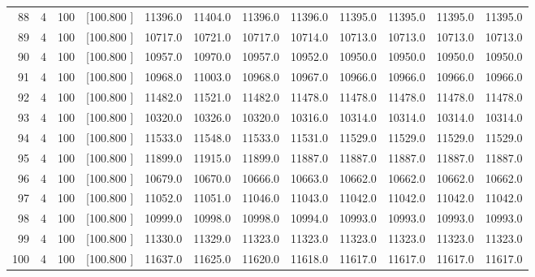 \documentclass[12pt,a4paper]{article}
\begin{document}
\begin{center}
{\begin{tabular}{r r r r r r r r r r r r}
  88&  4&100&[100.800   ]& 11396.0& 11404.0& 11396.0& 11396.0& 11395.0& 11395.0& 11395.0& 11395.0\\[-0.02in]
  89&  4&100&[100.800   ]& 10717.0& 10721.0& 10717.0& 10714.0& 10713.0& 10713.0& 10713.0& 10713.0\\[-0.02in]
  90&  4&100&[100.800   ]& 10957.0& 10970.0& 10957.0& 10952.0& 10950.0& 10950.0& 10950.0& 10950.0\\[-0.02in]
  91&  4&100&[100.800   ]& 10968.0& 11003.0& 10968.0& 10967.0& 10966.0& 10966.0& 10966.0& 10966.0\\[-0.02in]
  92&  4&100&[100.800   ]& 11482.0& 11521.0& 11482.0& 11478.0& 11478.0& 11478.0& 11478.0& 11478.0\\[-0.02in]
  93&  4&100&[100.800   ]& 10320.0& 10326.0& 10320.0& 10316.0& 10314.0& 10314.0& 10314.0& 10314.0\\[-0.02in]
  94&  4&100&[100.800   ]& 11533.0& 11548.0& 11533.0& 11531.0& 11529.0& 11529.0& 11529.0& 11529.0\\[-0.02in]
  95&  4&100&[100.800   ]& 11899.0& 11915.0& 11899.0& 11887.0& 11887.0& 11887.0& 11887.0& 11887.0\\[-0.02in]
  96&  4&100&[100.800   ]& 10679.0& 10670.0& 10666.0& 10663.0& 10662.0& 10662.0& 10662.0& 10662.0\\[-0.02in]
  97&  4&100&[100.800   ]& 11052.0& 11051.0& 11046.0& 11043.0& 11042.0& 11042.0& 11042.0& 11042.0\\[-0.02in]
  98&  4&100&[100.800   ]& 10999.0& 10998.0& 10998.0& 10994.0& 10993.0& 10993.0& 10993.0& 10993.0\\[-0.02in]
  99&  4&100&[100.800   ]& 11330.0& 11329.0& 11323.0& 11323.0& 11323.0& 11323.0& 11323.0& 11323.0\\[-0.02in]
 100&  4&100&[100.800   ]& 11637.0& 11625.0& 11620.0& 11618.0& 11617.0& 11617.0& 11617.0& 11617.0\\[-0.02in]

\hline
\end{tabular}}
\end{center}
\newpage
\end{document}
